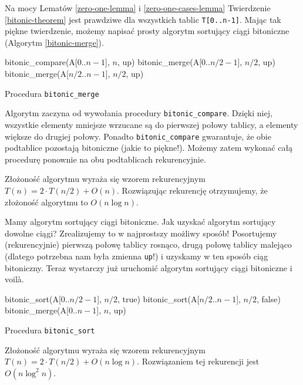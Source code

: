 Na mocy Lematów \ref{zero-one-lemma} i \ref{zero-one-cases-lemma} Twierdzenie \ref{bitonic-theorem} jest prawdziwe dla wszystkich tablic \texttt{T[0..n-1]}.
Mając tak piękne twierdzenie, możemy napisać prosty algorytm sortujący ciągi bitoniczne (Algorytm \ref{bitonic-merge}).

\begin{algorithm}[h]
  \DontPrintSemicolon
  
  
  
   {
     bitonic\_compare(A[$0$..$n-1$], $n$,   up)\;
     bitonic\_merge(A[$0$..$n/2-1$], $n/2$, up)\;
     bitonic\_merge(A[$n/2$..$n-1$], $n/2$, up)\;
   }
  \caption{Procedura \texttt{bitonic\_merge}}
  \label{bitonic-merge}
\end{algorithm}

Algorytm zaczyna od wywołania procedury \texttt{bitonic\_compare}.
Dzięki niej, wszystkie elementy mniejsze wrzucane są do pierwszej połowy tablicy, a elementy większe do drugiej połowy.
Ponadto \texttt{bitonic\_compare} gwarantuje, że obie podtablice pozostają bitoniczne (jakie to piękne!).
Możemy zatem wykonać całą procedurę ponownie na obu podtablicach rekurencyjnie.

Złożoność algorytmu wyraża się wzorem rekurencyjnym $T(n) = 2 \cdot T(n/2) + O(n)$.
Rozwiązując rekurencję otrzymujemy, że złożoność algorytmu to $O(n \log n)$.

Mamy algorytm sortujący ciągi bitoniczne.
Jak uzyskać algorytm sortujący dowolne ciągi?
Zrealizujemy to w najprostszy możliwy sposób!
Posortujemy (rekurencyjnie) pierwszą połowę tablicy rosnąco, drugą połowę tablicy malejąco (dlatego potrzebna nam była zmienna \texttt{up}!) i uzyskamy w ten sposób ciąg bitoniczny.
Teraz wystarczy już uruchomić algorytm sortujący ciągi bitoniczne i voilà.

\begin{algorithm}[h]
  \DontPrintSemicolon
  
  
  
   {
     bitonic\_sort(A[$0$..$n/2-1$], $n/2$, true)\;
     bitonic\_sort(A[$n/2$..$n-1$], $n/2$, false)\;
     bitonic\_merge(A[$0$..$n-1$], $n$, up)\;
   }
  \caption{Procedura \texttt{bitonic\_sort}}
  \label{bitonic-sort}
\end{algorithm}

Złożoność algorytmu wyraża się wzorem rekurencyjnym $T(n) = 2 \cdot T(n/2) + O(n \log n)$.
Rozwiązaniem tej rekurencji jest $O(n \log^2 n)$.